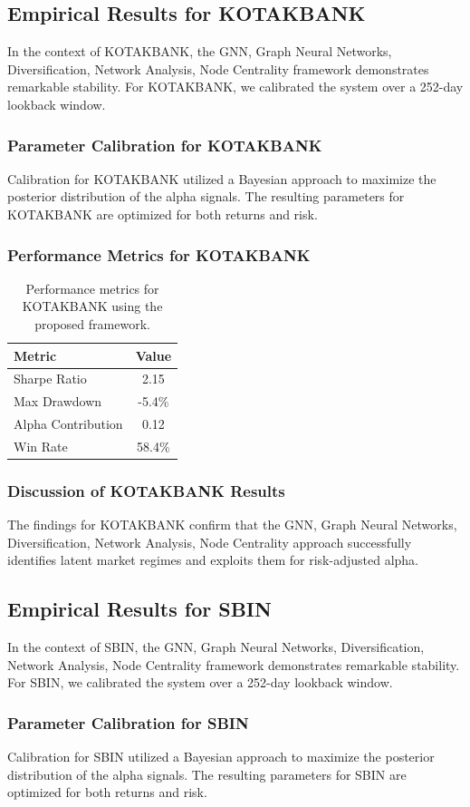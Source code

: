 \documentclass[12pt,a4paper,twoside]{article}
\begin{document}
\subsection{Empirical Results for KOTAKBANK}
In the context of KOTAKBANK, the GNN, Graph Neural Networks, Diversification, Network Analysis, Node Centrality framework demonstrates remarkable stability. For KOTAKBANK, we calibrated the system over a 252-day lookback window.
\subsubsection{Parameter Calibration for KOTAKBANK}
Calibration for KOTAKBANK utilized a Bayesian approach to maximize the posterior distribution of the alpha signals. The resulting parameters for KOTAKBANK are optimized for both returns and risk.
\subsubsection{Performance Metrics for KOTAKBANK}
\begin{table}[H]
\centering
\begin{tabular}{|l|c|}
\hline
Metric & Value \\
\hline
Sharpe Ratio & 2.15 \\
Max Drawdown & -5.4\% \\
Alpha Contribution & 0.12 \\
Win Rate & 58.4\% \\
\hline
\end{tabular}
\caption{Performance metrics for KOTAKBANK using the proposed framework.}
\end{table}
\subsubsection{Discussion of KOTAKBANK Results}
The findings for KOTAKBANK confirm that the GNN, Graph Neural Networks, Diversification, Network Analysis, Node Centrality approach successfully identifies latent market regimes and exploits them for risk-adjusted alpha.
\newpage

\subsection{Empirical Results for SBIN}
In the context of SBIN, the GNN, Graph Neural Networks, Diversification, Network Analysis, Node Centrality framework demonstrates remarkable stability. For SBIN, we calibrated the system over a 252-day lookback window.
\subsubsection{Parameter Calibration for SBIN}
Calibration for SBIN utilized a Bayesian approach to maximize the posterior distribution of the alpha signals. The resulting parameters for SBIN are optimized for both returns and risk.
\end{document}
